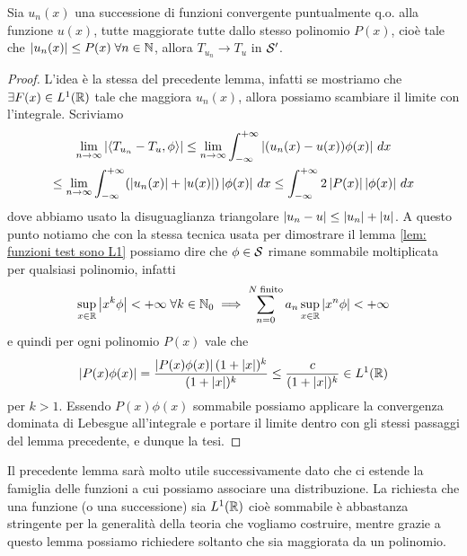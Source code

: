 \begin{lemma}[  ] \label{lem: successione maggiorata da un polinomio allora converge la distribuzione}
  Sia $ u_n(x) $ una successione di funzioni convergente puntualmente q.o. alla funzione $ u(x) $, tutte maggiorate tutte dallo stesso polinomio $ P(x) $, 
  cioè tale che $ \abs{u_n(x)} \leq P(x) \;\forall n\in\mathbb{N}$, allora $ T_{u_n} \to T_u $ in $ \S' $.
\end{lemma}
\begin{proof}
  L'idea è la stessa del precedente lemma, infatti se mostriamo che $ \exists F(x) \in L^1(\R) $ tale che maggiora $ u_n(x) $, allora possiamo scambiare 
  il limite con l'integrale. Scriviamo 
  \begin{gather}
    \lim_{n\to \infty} \abs{\sc{T_{u_n} - T_u , \phi}} \leq \lim_{n\to \infty} \int_{-\infty}^{+\infty} \abs{(u_n(x) - u(x))\phi(x)}\,dx 
    \\
    \leq \lim_{n\to \infty} \int_{-\infty}^{+\infty} (\abs{u_n(x)} + \abs{u(x)}) \abs{\phi(x)} \,dx 
    \leq \int_{-\infty}^{+\infty} 2\abs{P(x)} \abs{\phi(x)} \,dx 
  \end{gather}
  dove abbiamo usato la disuguaglianza triangolare $ \abs{u_n - u} \leq \abs{u_n} + \abs{u} $. A questo punto notiamo che con la stessa tecnica usata 
  per dimostrare il lemma \ref{lem: funzioni test sono L1} possiamo dire che $ \phi \in \S $ rimane sommabile moltiplicata per qualsiasi polinomio, 
  infatti 
  \begin{align}
    \sup_{x \in \R} \abs{x^k \phi} < +\infty \; \forall k \in \mathbb{N}_0 
    \implies \sum_{n=0}^{N \; \textnormal{finito}} a_n \sup_{x \in \R} \abs{x^n \phi} < +\infty
  \end{align}
  e quindi per ogni polinomio $ P(x) $ vale che 
  \begin{align}
    \abs{P(x) \phi(x)} = \frac{\abs{P(x)\phi(x)}(1 + \abs{x})^k}{(1 + \abs{x})^k} \leq \frac{c}{(1 + \abs{x})^k} \in L^1(\R)
  \end{align} per $ k > 1 $. Essendo $ P(x) \phi(x)  $ sommabile possiamo applicare la convergenza dominata di Lebesgue all'integrale e portare il 
  limite dentro con gli stessi passaggi del lemma precedente, e dunque la tesi.
\end{proof}
\begin{remark}
  Il precedente lemma sarà molto utile successivamente dato che ci estende la famiglia delle funzioni a cui possiamo associare una distribuzione. 
  La richiesta che una funzione (o una successione) sia $ L^1(\R) $ cioè sommabile è abbastanza stringente per la generalità della teoria 
  che vogliamo costruire, mentre grazie a questo lemma possiamo richiedere soltanto che sia maggiorata da un polinomio. 
\end{remark}

